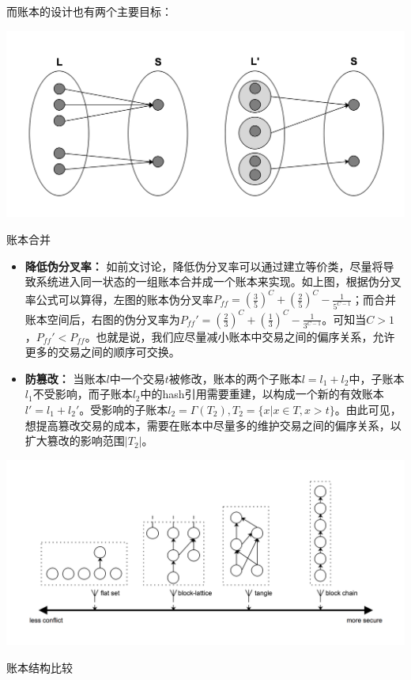 \documentclass[UTF8,nofonts]{ctexart}
\makeatletter
\newenvironment{figurehere}
 {\def\@captype{figure}}
 {}
\makeatother
\begin{document}
\begin{multicols}{2}
而账本的设计也有两个主要目标：

\begin{center}
\begin{figurehere}
\includegraphics[width=.7\linewidth]{image/ledger-merge.png}
\caption{账本合并}
\end{figurehere}
\end{center}

\begin{itemize}
	\item \textbf{降低伪分叉率：} 如前文讨论，降低伪分叉率可以通过建立等价类，尽量将导致系统进入同一状态的一组账本合并成一个账本来实现。如上图，根据伪分叉率公式可以算得，左图的账本伪分叉率$P_{ff}=\left (  \frac{3}{5} \right )^{C} + \left (  \frac{2}{5} \right )^{C} - \frac{1}{5^{C-1}}$；而合并账本空间后，右图的伪分叉率为${P_{ff}}'=\left (  \frac{2}{3} \right )^{C} + \left (  \frac{1}{3} \right )^{C} - \frac{1}{3^{C-1}}$。可知当$C > 1$，${P_{ff}}' < P_{ff}$。也就是说，我们应尽量减小账本中交易之间的偏序关系，允许更多的交易之间的顺序可交换。
	\item \textbf{防篡改：} 当账本$l$中一个交易$t$被修改，账本的两个子账本$l = l_{1} + l_{2}$中，子账本$l_{1}$不受影响，而子账本$l_{2}$中的hash引用需要重建，以构成一个新的有效账本${l}' = l_{1} + {l_{2}}'$。受影响的子账本$l_{2} = \Gamma(T_{2}),T_{2} = \lbrace x \vert x \in T, x > t \rbrace $。由此可见，想提高篡改交易的成本，需要在账本中尽量多的维护交易之间的偏序关系，以扩大篡改的影响范围$\vert T_{2} \vert$。
\end{itemize}

\begin{center}
\begin{figurehere}
\includegraphics[width=\linewidth]{image/ledger-compare.png}
\caption{账本结构比较}
\end{figurehere}
\end{center}


\end{multicols}
\end{document}
